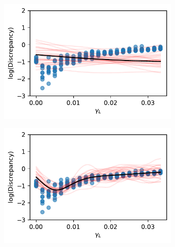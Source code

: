 \begin{figure}[htbp]
    \centering
    \begin{subfigure}[b]{0.5\textwidth}
        \centering
        \includegraphics[width=\textwidth]{
            ../champagne_GP_images/initial_gamma_L_slice_log_discrep.pdf
        }
    \end{subfigure}%
    \hfill%
    \begin{subfigure}[b]{0.5\textwidth}
        \centering
        \includegraphics[width=\textwidth]{
            ../champagne_GP_images/gamma_L_slice_400_bolfi_updates_log_discrep.pdf
        }
    \end{subfigure}
    \hfill%
    \begin{subfigure}[b]{0.5\textwidth}
        \centering

\end{subfigure}
\end{figure}
